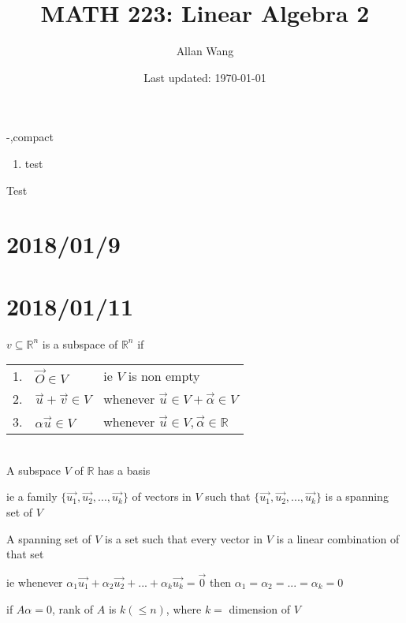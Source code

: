 \documentclass[12pt]{article}
\author{Allan Wang}
\date{Last updated: \today}
\title{MATH 223: Linear Algebra 2}
\renewcommand{\v}[1]{\overrightarrow{#1}}
\newcommand{\vectorset}[1]{\{\v{#1_1}, \v{#1_2}, ..., \v{#1_k}\}}
\newcommand{\vectorseqtwo}[2]{#1_1\v{#2_1} + #1_2\v{#2_2} + ... + #1_k\v{#2_k}}
\newcommand{\real}[0]{\mathbb{R}}
\begin{document}
\begin{shownto}{-,compact}
	\begin{enumerate}
		\item test
	\end{enumerate}
\end{shownto}

\begin{example}
	\item Test
\end{example}

\onehalfspacing
\maketitle
\tableofcontents
\pagebreak
\section{2018/01/9}
\section{2018/01/11}

$v \subseteq \real^n$ is a subspace of $\real^n$ if \\

\begin{tabular}{@{}l l l}
	1. & $\vec{O} \in V$ & ie $V$ is non empty \\
	2. & $\vec{u} + \vec{v} \in V$ & whenever $\vec{u} \in V + \vec{\alpha} \in V$ \\
	3. & $\alpha \vec{u} \in V$ & whenever $\vec{u} \in V, \vec{\alpha} \in \real$	
\end{tabular} \\

A subspace $V$ of $\real$ has a basis

ie a family $\vectorset{u}$ of vectors in $V$ such that $\vectorset{u}$ is a spanning set of $V$

A spanning set of $V$ is a set such that every vector in $V$ is a linear combination of that set

ie whenever $\vectorseqtwo{\alpha}{u} = \vec{0}$ then $\alpha_1 = \alpha_2 = ... = \alpha_k = 0$

if $A\alpha = 0$, rank of $A$ is $k (\le n)$, where $k =$ dimension of $V$
\end{document}
